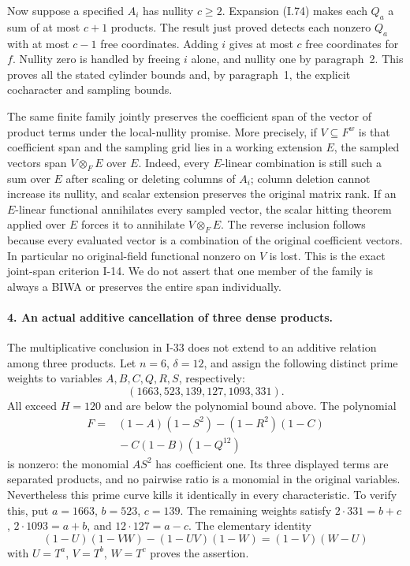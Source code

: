 Now suppose a specified $A_i$ has nullity $c\ge2$.
Expansion (I.74) makes each $Q_a$ a sum of at most $c+1$
products. The result just proved detects each nonzero $Q_a$
with at most $c-1$ free coordinates. Adding $i$ gives at
most $c$ free coordinates for $f$. Nullity zero is handled
by freeing $i$ alone, and nullity one by paragraph~2. This
proves all the stated cylinder bounds and, by paragraph~1,
the explicit cocharacter and sampling bounds.

The same finite family jointly preserves the coefficient
span of the vector of product terms under the local-nullity
promise. More precisely, if $V\subseteq F^w$ is that
coefficient span and the sampling grid lies in a working
extension $E$, the sampled vectors span $V\otimes_F E$
over $E$. Indeed, every $E$-linear combination is still
such a sum over $E$ after scaling or deleting columns of
$A_i$; column deletion cannot increase its nullity, and
scalar extension preserves the original matrix rank.
If an $E$-linear functional annihilates every sampled vector,
the scalar hitting theorem applied over $E$ forces it to
annihilate $V\otimes_F E$. The reverse inclusion follows
because every evaluated vector is a combination of the
original coefficient vectors. In particular no original-field
functional nonzero on $V$ is lost. This is the exact
joint-span criterion I-14. We do not assert that one member
of the family is always a BIWA or preserves the entire span
individually.

\paragraph{4. An actual additive cancellation of three dense products.}
The multiplicative conclusion in I-33 does not extend to an
additive relation among three products. Let $n=6$, $\delta=12$,
and assign the following distinct prime weights to variables
$A,B,C,Q,R,S$, respectively:
\[
 (1663,523,139,127,1093,331).
\]
All exceed $H=120$ and are below the polynomial bound above.
The polynomial
\[
 \begin{aligned}
 F={}&(1-A)(1-S^2)-(1-R^2)(1-C)\\
     &{}-C(1-B)(1-Q^{12})
 \end{aligned}
\]
is nonzero: the monomial $AS^2$ has coefficient one.
Its three displayed terms are separated products, and no
pairwise ratio is a monomial in the original variables.
Nevertheless this prime curve kills it identically in every
characteristic. To verify this, put $a=1663$, $b=523$,
$c=139$. The remaining weights satisfy
$2\cdot331=b+c$, $2\cdot1093=a+b$, and
$12\cdot127=a-c$. The elementary identity
\[
 (1-U)(1-VW)-(1-UV)(1-W)=(1-V)(W-U)
\]
with $U=T^a$, $V=T^b$, $W=T^c$ proves the assertion.

